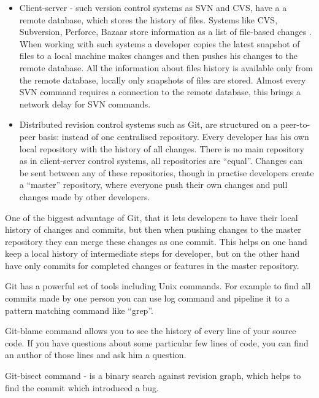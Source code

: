    \begin{itemize}
   \item Client-server - such version control systems as SVN and CVS, have a 
    a remote database, which stores the history of files. Systems like CVS,
    Subversion, Perforce, Bazaar store information as  a list of file-based
    changes \cite{gitBasics}. When working with such systems a developer copies
    the latest snapshot of files to a local machine makes changes and then
    pushes his changes to the remote database. All the information about
    files history is available only from the remote database, locally only
    snapshots of files are stored. Almost every SVN command requires a
    connection to the remote database, this brings a network delay for
    SVN commands.
    
   \item Distributed revision control systems such as Git, are structured on a
    peer-to-peer basis: instead of one centralised repository. Every developer
    has his own local repository with the history of all changes. There is no
     main repository as in client-server control systems, all repositories are
     ``equal''. Changes can be sent between any of these repositories, though
     in practise developers create a ``master'' repository,
      where everyone push their own changes and pull
    changes made by other developers.
  \end{itemize}
  
  One of the biggest advantage of Git, that it lets developers to
  have their local history of changes and commits, 
  but then when pushing changes to the master repository they can merge these
  changes as one commit.
  This helps on one hand keep a local history of intermediate steps for
  developer, but on the other hand have only commits for completed changes
  or features in the master repository. 
  
  Git has a powerful set of tools including  Unix commands. For example to find
  all commits made by one person you can use log command and pipeline it to a pattern matching command like ``grep''.
  
   Git-blame command allows you to see the history of every line of your source
   code. If you have questions about some particular few lines of code,
   you can find an author of those lines and ask him a question.
   
   Git-bisect command - is a binary search against revision graph, which helps to find the commit which
   introduced a bug.

